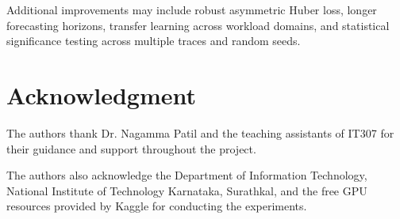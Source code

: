 \documentclass[conference]{IEEEtran}
\begin{document}
Additional improvements may include robust asymmetric Huber loss, longer forecasting horizons, transfer learning across workload domains, and statistical significance testing across multiple traces and random seeds.

\section*{Acknowledgment}

The authors thank Dr. Nagamma Patil and the teaching assistants of IT307 for their guidance and support throughout the project.

The authors also acknowledge the Department of Information Technology, National Institute of Technology Karnataka, Surathkal, and the free GPU resources provided by Kaggle for conducting the experiments.
\end{document}
